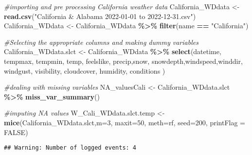\documentclass[
]{article}
\newenvironment{Shaded}{\begin{snugshade}}{\end{snugshade}}
\newcommand{\AttributeTok}[1]{\textcolor[rgb]{0.13,0.29,0.53}{#1}}
\newcommand{\CommentTok}[1]{\textcolor[rgb]{0.56,0.35,0.01}{\textit{#1}}}
\newcommand{\ConstantTok}[1]{\textcolor[rgb]{0.56,0.35,0.01}{#1}}
\newcommand{\DecValTok}[1]{\textcolor[rgb]{0.00,0.00,0.81}{#1}}
\newcommand{\FunctionTok}[1]{\textcolor[rgb]{0.13,0.29,0.53}{\textbf{#1}}}
\newcommand{\NormalTok}[1]{#1}
\newcommand{\OtherTok}[1]{\textcolor[rgb]{0.56,0.35,0.01}{#1}}
\newcommand{\SpecialCharTok}[1]{\textcolor[rgb]{0.81,0.36,0.00}{\textbf{#1}}}
\newcommand{\StringTok}[1]{\textcolor[rgb]{0.31,0.60,0.02}{#1}}
\begin{document}
\begin{Shaded}
\begin{Highlighting}[]
\CommentTok{\#importing and pre processing California  weather data }
\NormalTok{California\_WDdata }\OtherTok{\textless{}{-}} \FunctionTok{read.csv}\NormalTok{(}\StringTok{"California \& Alabama 2022{-}01{-}01 to 2022{-}12{-}31.csv"}\NormalTok{)}
\NormalTok{California\_WDdata }\OtherTok{\textless{}{-}}\NormalTok{  California\_WDdata }\SpecialCharTok{\%\textgreater{}\%}
  \FunctionTok{filter}\NormalTok{(name }\SpecialCharTok{==} \StringTok{"California"}\NormalTok{)}

\CommentTok{\#Selecting the appropriate columns and making dummy variables }
\NormalTok{California\_WDdata.slct }\OtherTok{\textless{}{-}}\NormalTok{ California\_WDdata }\SpecialCharTok{\%\textgreater{}\%}
  \FunctionTok{select}\NormalTok{(datetime, tempmax, tempmin, temp, }
\NormalTok{          feelslike, precip,snow, snowdepth,windspeed,winddir, }
\NormalTok{          windgust, visibility, cloudcover, humidity, conditions )}

\CommentTok{\#dealing with missing variables}
\NormalTok{NA\_valuesCali }\OtherTok{\textless{}{-}}\NormalTok{ California\_WDdata.slct }\SpecialCharTok{\%\textgreater{}\%}
  \FunctionTok{miss\_var\_summary}\NormalTok{()}

\CommentTok{\#imputing NA values}
\NormalTok{W\_Cali\_WDdata.slct.temp }\OtherTok{\textless{}{-}} \FunctionTok{mice}\NormalTok{(California\_WDdata.slct,}\AttributeTok{m=}\DecValTok{3}\NormalTok{, }
                                \AttributeTok{maxit=}\DecValTok{50}\NormalTok{, }
                                \AttributeTok{meth=}\StringTok{\textquotesingle{}rf\textquotesingle{}}\NormalTok{, }
                                \AttributeTok{seed=}\DecValTok{200}\NormalTok{, }
                                \AttributeTok{printFlag =} \ConstantTok{FALSE}\NormalTok{)}
\end{Highlighting}
\end{Shaded}

\begin{verbatim}
## Warning: Number of logged events: 4
\end{verbatim}
\end{document}
